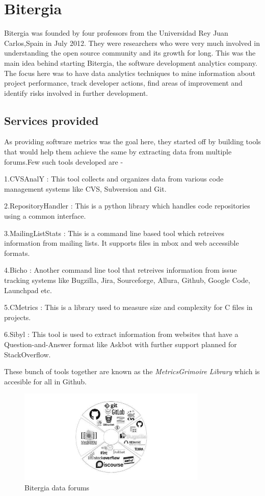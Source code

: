 \documentclass[double,12pt]{beavtex}
\begin{document}
\chapter{Bitergia}
Bitergia was founded by four professors from the 	
Universidad Rey Juan Carlos,Spain in July 2012. They were researchers who were very much involved in understanding the open source community and its growth for long. This was the main idea behind starting Bitergia, the software development analytics company. The focus here was to have data analytics techniques to mine information about project performance, track developer actions, find areas of improvement and identify risks involved in further development. 
\section{Services provided}
As providing software metrics was the goal here, they started off by building tools that would help them achieve the same by extracting data from multiple forums.Few such tools developed are - 

1.CVSAnalY : This tool collects and organizes data from various code management systems like CVS, Subversion and Git.

2.RepositoryHandler : This is a python library which handles code repositories using a common interface.

3.MailingListStats : This is a command line based tool which retreives information from mailing lists. It supports files in mbox and web accessible formats.

4.Bicho : Another command line tool that retreives information from issue tracking systems like Bugzilla, Jira, Sourceforge, Allura, Github, Google Code, Launchpad etc.

5.CMetrics : This is a library used to measure size and complexity for C files in projects.

6.Sibyl : This tool is used to extract information from websites that have a Question-and-Answer format like Askbot with further support planned for StackOverflow.

These bunch of tools together are known as the \emph{MetricsGrimoire Library} which is accesible for all in Github.

\begin{figure}[!ht]
\centering
\includegraphics[width=90mm]{bitergia.jpg}
\caption{Bitergia data forums}
\end{figure}
\end{document}
